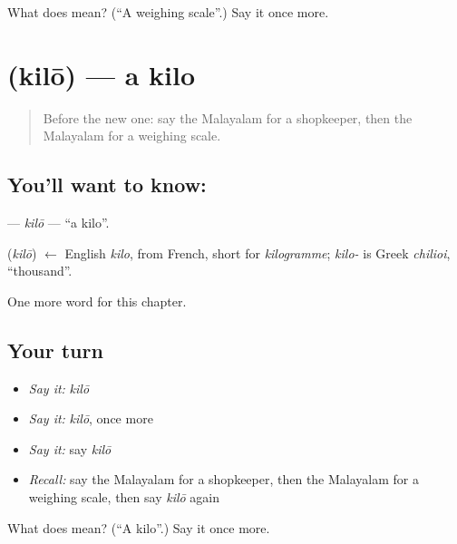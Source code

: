 \begin{tcolorbox}[breakable,colback=teal!4,colframe=teal!35!black,title={Before you move on}]
What does  mean? (\textquotedblleft{}A weighing scale\textquotedblright{}.) Say it once more.
\end{tcolorbox}
\section[\texorpdfstring{\ml{കിലോ} (kilō)}{കിലോ (kilō)}]{ (kilō) — a kilo}

\label{lesson:ML-C260-kilo}



\begin{quote}
Before the new one: say the Malayalam for a shopkeeper, then the Malayalam for a weighing scale.
\end{quote}

\subsection*{You'll want to know: }
\textbf{} — \emph{kilō} — \textquotedblleft{}a kilo\textquotedblright{}.

\begin{cousinweb}
\textbf{} (\emph{kilō}) $\leftarrow$ English \emph{kilo}, from French, short for \emph{kilogramme}; \emph{kilo-} is Greek \emph{chilioi}, \textquotedblleft{}thousand\textquotedblright{}.
\end{cousinweb}

\begin{grammarlens}[title={What you've built}]
One more word for this chapter.
\end{grammarlens}

\subsection*{Your turn}
\begin{itemize}
\raggedright
  \item \emph{Say it:} \emph{kilō}
  \item \emph{Say it:} \emph{kilō}, once more
  \item \emph{Say it:} say \emph{kilō}
  \item \emph{Recall:} say the Malayalam for a shopkeeper, then the Malayalam for a weighing scale, then say \emph{kilō} again
\end{itemize}

\begin{tcolorbox}[breakable,colback=teal!4,colframe=teal!35!black,title={Before you move on}]
What does  mean? (\textquotedblleft{}A kilo\textquotedblright{}.) Say it once more.
\end{tcolorbox}
